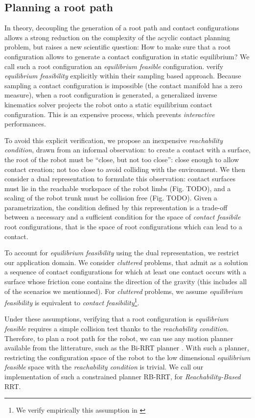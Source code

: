 \subsection{Planning a root path}
\label{sec:steve_root}
In theory, decoupling the generation of a root path and contact configurations allows a strong 
reduction on the complexity of the acyclic contact planning problem, but raises a new scientific question: 
How to make sure that a root configuration allows to generate a contact configuration in static equilibrium?
We call such a root configuration an \textit{equilibrium feasible} configuration.
\cite{Bouyarmane2009} verify \textit{equilibrium feasibility} explicitly within their sampling based approach.
Because sampling a contact configuration is impossible (the contact manifold has a zero measure), when a root configuration is generated, a generalized inverse kinematics solver 
projects the robot onto a static equilibrium contact configuration. This is an expensive process, which prevents \textit{interactive} performances.

To avoid this explicit verification, we propose an inexpensive \textit{reachability condition}, drawn from an informal observation:
to create a contact with a surface, the root of the robot must be ``close, but not too close'': close enough
to allow contact creation; not too close to avoid colliding with the environment.
We then consider a dual representation to formulate this observation:
contact surfaces must lie in the reachable workspace of the robot limbs (Fig. TODO), and a scaling of the robot trunk must be collision free (Fig. TODO).
Given a parametrization, the condition defined by this representation is a trade-off between a necessary and a sufficient condition for the space of 
\textit{contact feasibile} root configurations, that is the space of root configurations which can lead to a contact.

To account for \textit{equilibrium feasibility} using the dual representation, we restrict our application domain.
We consider \textit{cluttered} problems, that admit as a solution a sequence of contact configurations for which at least one contact occurs with a surface whose friction cone contains the direction of the gravity (this includes all of the scenarios we mentionned).
For \textit{cluttered} problems, we assume \textit{equilibrium feasibility} is equivalent to \textit{contact feasibility}\footnote{We verify empirically this assumption in \cite{tonneauijrr16}}.

Under these assumptions, verifying that a root configuration is \textit{equilibrium feasible} requires a simple collision test thanks to the \textit{reachability condition}.
Therefore, to plan a root path for the robot, we can use any motion planner available from the litterature, such 
as the Bi-RRT planner \citep{770022}. With such a planner, restricting the configuration space of the robot to the low dimensional \textit{equilibrium feasible} space with the \textit{reachability condition} is trivial. We call our implementation of such a constrained planner RB-RRT, for \textit{Reachability-Based} RRT.

